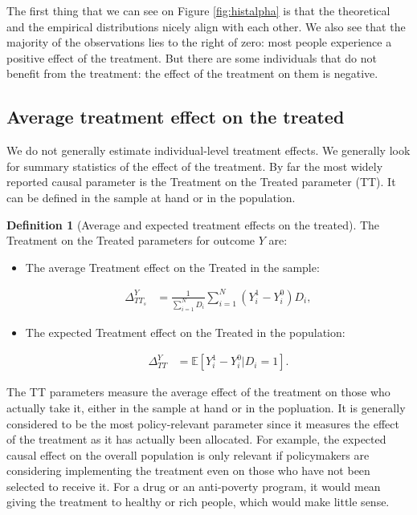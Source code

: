 \documentclass[
]{book}
\newcommand{\esp}[1]{\mathbb{E}[ #1 ]}
\theoremstyle{definition}
\newtheorem{definition}{Definition}[chapter]
\theoremstyle{definition}
\theoremstyle{definition}
\theoremstyle{definition}
\theoremstyle{remark}
\begin{document}
The first thing that we can see on Figure \ref{fig:histalpha} is that the theoretical and the empirical distributions nicely align with each other.
We also see that the majority of the observations lies to the right of zero: most people experience a positive effect of the treatment.
But there are some individuals that do not benefit from the treatment: the effect of the treatment on them is negative.

\hypertarget{average-treatment-effect-on-the-treated}{%
\subsection{Average treatment effect on the treated}\label{average-treatment-effect-on-the-treated}}

We do not generally estimate individual-level treatment effects.
We generally look for summary statistics of the effect of the treatment.
By far the most widely reported causal parameter is the Treatment on the Treated parameter (TT).
It can be defined in the sample at hand or in the population.

\begin{definition}[Average and expected treatment effects on the treated]
\protect\hypertarget{def:TT}{}{\label{def:TT} \iffalse (Average and expected treatment effects on the treated) \fi{} }The Treatment on the Treated parameters for outcome \(Y\) are:
\end{definition}

\begin{itemize}
\item
  The average Treatment effect on the Treated in the sample:

  \begin{align*}
  \Delta^Y_{TT_s} & = \frac{1}{\sum_{i=1}^ND_i}\sum_{i=1}^N(Y_i^1-Y_i^0)D_i,
  \end{align*}
\item
  The expected Treatment effect on the Treated in the population:

  \begin{align*}
  \Delta^Y_{TT} & = \esp{Y_i^1-Y_i^0|D_i=1}.
  \end{align*}
\end{itemize}

The TT parameters measure the average effect of the treatment on those who actually take it, either in the sample at hand or in the popluation.
It is generally considered to be the most policy-relevant parameter since it measures the effect of the treatment as it has actually been allocated.
For example, the expected causal effect on the overall population is only relevant if policymakers are considering implementing the treatment even on those who have not been selected to receive it.
For a drug or an anti-poverty program, it would mean giving the treatment to healthy or rich people, which would make little sense.
\end{document}
